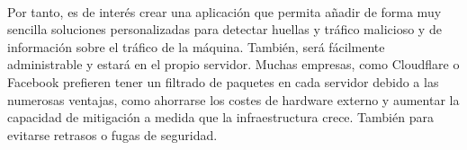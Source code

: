 \\Por tanto, es de interés crear una aplicación que permita añadir de forma muy sencilla soluciones personalizadas para detectar huellas y tráfico malicioso y de información sobre el tráfico de la máquina. También, será fácilmente administrable y estará en el propio servidor. Muchas empresas, como Cloudflare \cite{mtvDDOSCLoudflare} o Facebook \cite{mtvDDOSFacebook} prefieren tener un filtrado de paquetes en cada servidor debido a las numerosas ventajas, como ahorrarse los costes de hardware externo y aumentar la capacidad de mitigación a medida que la infraestructura crece. También para evitarse retrasos o fugas de seguridad.